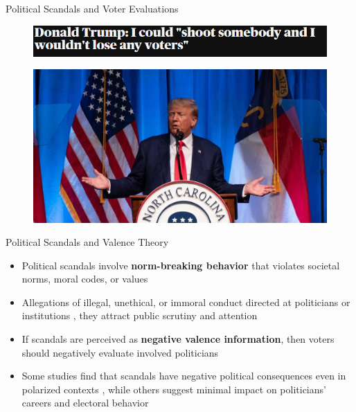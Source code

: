 \documentclass[9pt, aspectratio=169]{beamer}
\newcommand{\customcite}[1]{\textcolor{blue}{\footnotesize\parencite{#1}}}
\newcommand{\customcites}[1]{\textcolor{blue}{\footnotesize\parencites{#1}}}
\begin{document}
\begin{section} {Political Scandals and Voter Evaluations}
\begin{frame} %
    \begin{figure}
        \centering
        \includegraphics[width=\linewidth]{images/Trump1.png}
        \label{fig:trump1}
    \end{figure}
        \begin{figure}
        \centering
        \includegraphics[width=0.7\linewidth]{images/Trump2.jpg}
        \label{fig:trump2}
    \end{figure}
\end{frame}

\begin{frame}{Political Scandals and Valence Theory}
    \begin{itemize}
        \item Political scandals involve \textbf{norm-breaking behavior} that violates societal norms, moral codes, or values \customcites{genovese_2010, Thompson_2013} \vspace{0.3cm}
        \item Allegations of illegal, unethical, or immoral conduct directed at politicians or institutions \customcite{Rottinghaus_2023}, they attract public scrutiny and attention \customcites{Thompson_2013, Marion_2010}\vspace{0.2cm}
        \item If scandals are perceived as \textbf{negative valence information}, then voters should negatively evaluate involved politicians \customcites{doherty2014does, Rottinghaus_2023} \vspace{0.3cm}
        \item Some studies find that scandals have negative political consequences even in polarized contexts \customcites{darr2019collision, wolsky2022scandal}, while others suggest minimal impact on politicians' careers and electoral behavior \customcites{funck2021partisanship, Lee_2023}
    \end{itemize}
\end{frame}


\end{section}
\end{document}
